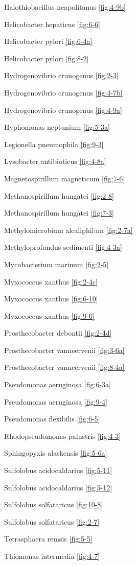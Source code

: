 \documentclass[]{tufte-book}
\begin{document}
Halothiobacillus neapolitanus \ref{fig:4-9b}

Helicobacter hepaticus \ref{fig:6-6}

Helicobacter pylori \ref{fig:6-4a}

Helicobacter pylori \ref{fig:8-2}

Hydrogenovibrio crunogenus \ref{fig:2-3}

Hydrogenovibrio crunogenus \ref{fig:4-7b}

Hydrogenovibrio crunogenus \ref{fig:4-9a}

Hyphomonas neptunium \ref{fig:5-3a}

Legionella pneumophila \ref{fig:9-3}

Lysobacter antibioticus \ref{fig:4-8a}

Magnetospirillum magneticum \ref{fig:7-6}

Methanospirillum hungatei \ref{fig:2-8}

Methanospirillum hungatei \ref{fig:7-3}

Methylomicrobium alcaliphilum \ref{fig:2-7a}

Methyloprofundus sedimenti \ref{fig:4-3a}

Mycobacterium marinum \ref{fig:2-5}

Myxococcus xanthus \ref{fig:2-4c}

Myxococcus xanthus \ref{fig:6-10}

Myxococcus xanthus \ref{fig:9-6}

Prosthecobacter debontii \ref{fig:2-4d}

Prosthecobacter vanneervenii \ref{fig:3-6a}

Prosthecobacter vanneervenii \ref{fig:8-4a}

Pseudomonas aeruginosa \ref{fig:6-3a}

Pseudomonas aeruginosa \ref{fig:9-4}

Pseudomonas flexibilis \ref{fig:6-5}

Rhodopseudomonas palustris \ref{fig:4-3}

Sphingopyxis alaskensis \ref{fig:5-6a}

Sulfolobus acidocaldarius \ref{fig:5-11}

Sulfolobus acidocaldarius \ref{fig:5-12}

Sulfolobus solfataricus \ref{fig:10-8}

Sulfolobus solfataricus \ref{fig:2-7}

Tetrasphaera remsis \ref{fig:5-5}

Thiomonas intermedia \ref{fig:4-7}
\end{document}
